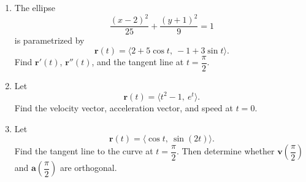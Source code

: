 \documentclass[12pt]{article}
\begin{document}
\begin{enumerate}[leftmargin=*, itemsep=1em, topsep=0.8em]
  \item The ellipse
  \[
  \frac{(x-2)^2}{25}+\frac{(y+1)^2}{9}=1
  \]
  is parametrized by
  \[
  \mathbf{r}(t)=\langle 2+5\cos t,\ -1+3\sin t\rangle.
  \]
  Find $\mathbf{r}'(t)$, $\mathbf{r}''(t)$, and the tangent line at $t=\dfrac{\pi}{2}$.

  \item Let
  \[
  \mathbf{r}(t)=\langle t^2-1,\ e^t\rangle.
  \]
  Find the velocity vector, acceleration vector, and speed at $t=0$.

  \item Let
  \[
  \mathbf{r}(t)=\langle \cos t,\ \sin(2t)\rangle.
  \]
  Find the tangent line to the curve at $t=\dfrac{\pi}{2}$. Then determine whether $\mathbf{v}\!\left(\dfrac{\pi}{2}\right)$ and $\mathbf{a}\!\left(\dfrac{\pi}{2}\right)$ are orthogonal.
\end{enumerate}
\end{document}
